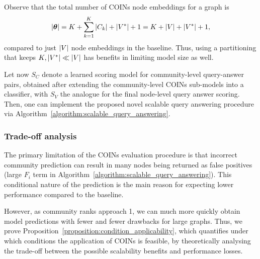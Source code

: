 Observe that the total number of COINs node embeddings for a graph is 
\begin{equation}
    \mathopen{}\left|\boldsymbol{\theta}\right| = K + \sum_{k=1}^{K}{\mathopen{}\left|C_k\right|} + \mathopen{}\left|V^*\right| + 1 = K + \mathopen{}\left|V\right| + \mathopen{}\left|V^*\right| + 1,
\end{equation}
compared to just $\mathopen{}\left|V\right|$ node embeddings in the baseline. Thus, using a partitioning that keeps $K, \mathopen{}\left|V^*\right| \ll \mathopen{}\left|V\right|$ has benefits in limiting model size as well. 

Let now $S_C$ denote a learned scoring model for community-level query-answer pairs, obtained after extending the community-level COINs sub-models into a classifier, with $S_V$ the analogue for the final node-level query answer scoring. Then, one can implement the proposed novel scalable query answering procedure via Algorithm~\ref{algorithm:scalable_query_answering}.

\begin{algorithm}[H]
\caption{COINs query answering evaluation}
\label{algorithm:scalable_query_answering}
\begin{algorithmic}[1]
\ENDFOR
{}
\end{algorithmic}
\end{algorithm} 

\subsubsection{Trade-off analysis}

The primary limitation of the COINs evaluation procedure is that incorrect community prediction can result in many nodes being returned as false positives (large $F_i$ term in Algorithm~\ref{algorithm:scalable_query_answering}). This conditional nature of the prediction is the main reason for expecting lower performance compared to the baseline. 

However, as community ranks approach 1, we can much more quickly obtain model predictions with fewer and fewer drawbacks for large graphs. Thus, we prove Proposition~\ref{proposition:condition_applicability}, which quantifies under which conditions the application of COINs is feasible, by theoretically analysing the trade-off between the possible scalability benefits and performance losses. 

